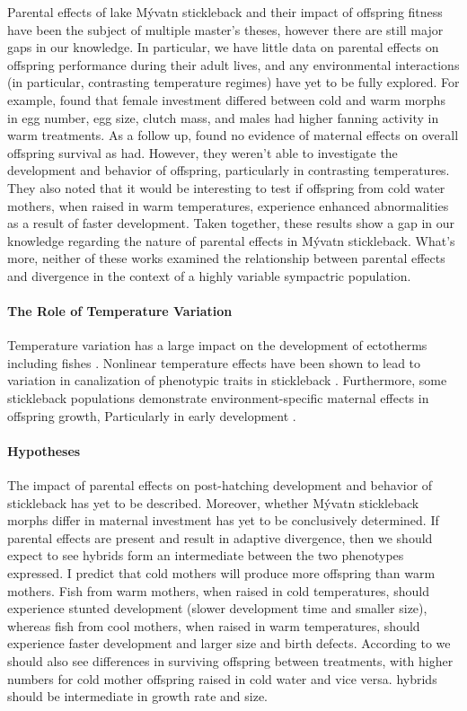 \documentclass[12pt]{extarticle}
\begin{document}
Parental effects of lake M\'yvatn stickleback and their impact of offspring fitness have been the subject of multiple master's theses, however there are still major gaps in our knowledge. In particular, we have little data on parental effects on offspring performance during their adult lives, and any environmental interactions (in particular, contrasting temperature regimes) have yet to be fully explored. For example, \citet{Senn} found that female investment differed between cold and warm morphs in egg number, egg size, clutch mass, and males had higher fanning activity in warm treatments. As a follow up, \citet{Diethelm} found no evidence of maternal effects on overall offspring survival as \citet{Senn} had. However, they weren't able to investigate the development and behavior of offspring, particularly in contrasting temperatures. They also noted that it would be interesting to test if offspring from cold water mothers, when raised in warm temperatures, experience enhanced abnormalities as a result of faster development. Taken together, these results show a gap in our knowledge regarding the nature of parental effects in M\'yvatn stickleback. What's more, neither of these works examined the relationship between parental effects and divergence in the context of a highly variable sympactric population.

\paragraph{The Role of Temperature Variation}
Temperature variation has a large impact on the development of ectotherms including fishes \citep{Massey2021}. Nonlinear temperature effects have been shown to lead to variation in canalization of phenotypic traits in stickleback \citep{Ramler2014}. Furthermore, some stickleback populations demonstrate environment-specific maternal effects in offspring growth, Particularly in early development \citep{Ramler2014, Shama2014b}.

\paragraph{Hypotheses}
The impact of parental effects on post-hatching development and behavior of stickleback has yet to be described. Moreover, whether M\'yvatn stickleback morphs differ in maternal investment has yet to be conclusively determined. 
If parental effects are present and result in adaptive divergence, then we should expect to see hybrids form an intermediate between the two phenotypes expressed. I predict that cold mothers will produce more offspring than warm mothers. Fish from warm mothers, when raised in cold temperatures, should experience stunted development (slower development time and smaller size), whereas fish from cool mothers, when raised in warm temperatures, should experience faster development and larger size and birth defects.
According to \citet{Senn} we should also see differences in surviving offspring between treatments, with higher numbers for cold mother offspring raised in cold water and vice versa. hybrids should be intermediate in growth rate and size.
\end{document}
